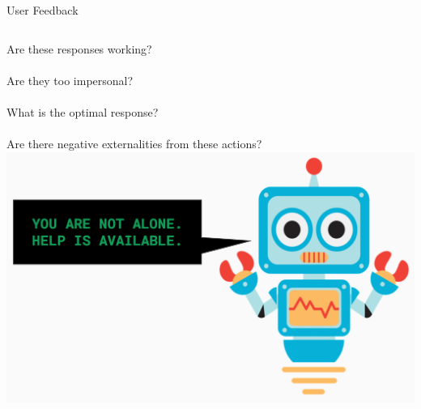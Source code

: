 \documentclass[nobackground,dvipsnames,table]{beamer}
\begin{document}
\begin{frame}{User Feedback}
    \begin{columns}
            Are these responses working?\\~\\
            Are they too impersonal?\\~\\
            What is the optimal response?\\~\\
            Are there negative externalities from these actions?
            \includegraphics[width=\textwidth]{cute-robot}
    \end{columns}
\end{frame}
\end{document}

